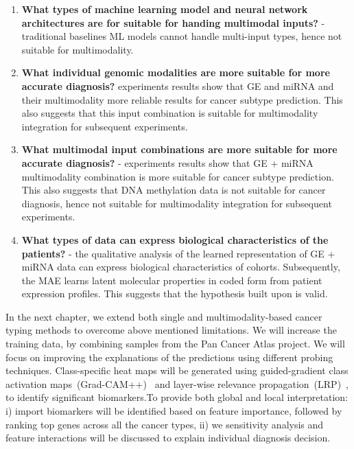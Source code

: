 \begin{enumerate}[noitemsep]
    \item \textbf{What types of machine learning model and neural network architectures are for suitable for handing multimodal inputs?} - traditional baselines ML models cannot handle multi-input types, hence not suitable for multimodality. 
    \item \textbf{What individual genomic modalities are more suitable for more accurate diagnosis?} experiments results show that GE and miRNA and their multimodality more reliable results for cancer subtype prediction. This also suggests that this input combination is suitable for multimodality integration for subsequent experiments. 
    \item \textbf{What multimodal input combinations are more suitable for more accurate diagnosis?} - experiments results show that GE + miRNA multimodality combination is more suitable for cancer subtype prediction. This also suggests that DNA methylation data is not suitable for cancer diagnosis, hence not suitable for multimodality integration for subsequent experiments.
    \item \textbf{What types of data can express biological characteristics of the patients?} - the qualitative analysis of the learned representation of GE + miRNA data can express biological characteristics of cohorts. Subsequently, the MAE learns latent molecular properties in coded form from patient expression profiles. This suggests that the hypothesis built upon is valid. 
\end{enumerate}

\hspace*{3.5mm} In the next chapter, we extend both single and multimodality-based cancer typing methods to overcome above mentioned limitations. We will increase the training data, by combining samples from the Pan Cancer Atlas project. We will focus on improving the explanations of the predictions using different probing techniques.
Class-specific heat maps will be generated using guided-gradient class activation maps~(Grad-CAM++)~\cite{chattopadhay2018grad} and layer-wise relevance propagation~(LRP)~\cite{LRP3}, to identify significant biomarkers.To provide both global and local interpretation: i) import biomarkers will be identified based on feature importance, followed by ranking top genes across all the cancer types, ii) we sensitivity analysis and feature interactions will be discussed to explain individual diagnosis decision. 
